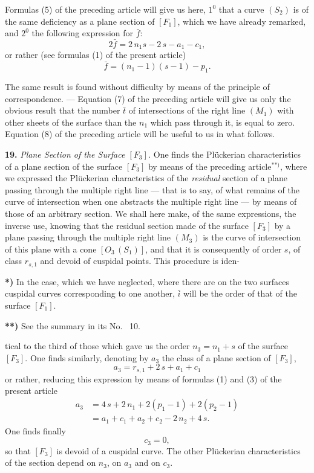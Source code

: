 \documentclass{article}
\begin{document}
Formulas (5) of the preceding article will give us here, $1^0$ that a curve $(S_2)$ is of the same deficiency as a plane section of $[F_1]$, which we have already remarked, and $2^0$ the following expression for $\bar{f}$:
\[
2\bar{f} = 2\,n_1 s - 2\,s - a_1 - c_1,
\]
or rather (see formulas (1) of the present article)
\[
\bar{f} = (n_1 - 1)(s - 1) - p_1.
\]

The same result is found without difficulty by means of the principle of correspondence. --- Equation (7) of the preceding article will give us only the obvious result that the number $\bar{t}$ of intersections of the right line $(M_1)$ with other sheets of the surface than the $n_1$ which pass through it, is equal to zero. Equation (8) of the preceding article will be useful to us in what follows.

\textbf{19.} \emph{Plane Section of the Surface $[F_3]$.} One finds the Plückerian characteristics of a plane section of the surface $[F_3]$ by means of the preceding article${}^{**)}$, where we expressed the Plückerian characteristics of the \emph{residual} section of a plane passing through the multiple right line --- that is to say, of what remains of the curve of intersection when one abstracts the multiple right line --- by means of those of an arbitrary section. We shall here make, of the same expressions, the inverse use, knowing that the residual section made of the surface $[F_3]$ by a plane passing through the multiple right line $(M_3)$ is the curve of intersection of this plane with a cone $[O_3\,(S_1)]$, and that it is consequently of order $s$, of class $r_{s, 1}$ and devoid of cuspidal points. This procedure is iden-

\textbf{*)} In the case, which we have neglected, where there are on the two surfaces cuspidal curves corresponding to one another, $\bar{i}$ will be the order of that of the surface $[F_1]$.

\textbf{**)} See the summary in its No.~ 10.

tical to the third of those which gave us the order $n_3 = n_1 + s$ of the surface $[F_3]$. One finds similarly, denoting by $a_3$ the class of a plane section of $[F_3]$,
\[
a_3 = r_{s, 1} + 2\,s + a_1 + c_1
\]
or rather, reducing this expression by means of formulas (1) and (3) of the present article
\[
\begin{aligned}
a_3 &= 4\,s + 2\,n_1 + 2(p_1 - 1) + 2(p_2 - 1) \\
&= a_1 + c_1 + a_2 + c_2 - 2\,n_2 + 4\,s.
\end{aligned} \tag{4}
\]
One finds finally
\[
c_3 = 0, \tag{5}
\]
so that $[F_3]$ is devoid of a cuspidal curve. The other Plückerian characteristics of the section depend on $n_3$, on $a_3$ and on $c_3$.
\end{document}
